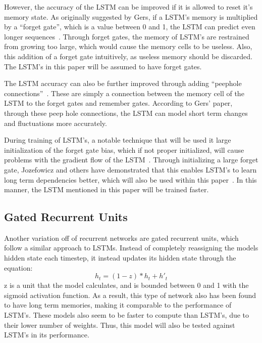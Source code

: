 \documentclass{article}
\begin{document}
However, the accuracy of the LSTM can be improved if it is allowed to reset
it's memory state. As originally suggested by Gers, if a LSTM's memory is
multiplied by a ``forget gate'', which is a value between 0 and 1, the LSTM can
predict even longer sequences~\cite{forgetgate}. Through forget gates, the memory of
LSTM's are restrained from growing too large, which would cause the memory cells
to be useless. Also, this addition of a forget gate intuitively, as useless
memory should be discarded. The LSTM's in this paper will be assumed to have
forget gates.

The LSTM accuracy can also be further improved through adding ``peephole
connections''~\cite{lstmpeep}. These are simply a connection between the memory
cell of the LSTM to the forget gates and remember gates. According to Gers'
paper, through these peep hole connections, the LSTM can model short term
changes and fluctuations more accurately.

During training of LSTM's, a notable technique that will be used it large
initialization of the forget gate bias, which if not proper initialized, will
cause problems with the gradient flow of the LSTM~\cite{lstmbias}. Through
initializing a large forget gate, Jozefowicz and others have demonstrated that
this enables LSTM's to learn long term dependencies better, which will also be
used within this paper~\cite{lstmbias}. In this manner, the LSTM mentioned in
this paper will be trained faster.


\subsection{Gated Recurrent Units}
Another variation off of recurrent networks are gated recurrent units, which
follow a similar approach to LSTMs. Instead of completely reassigning the models
hidden state each timestep, it instead updates its hidden state through the
equation:
$$h_t = (1 - z) * h_t + h'_t $$
z is a unit that the model calculates, and is bounded between 0 and 1 with the
sigmoid activation function. As a result, this type of network also has been
found to have long term memories, making it comparable to the performance of
LSTM's. These models also seem to be faster to compute than LSTM's, due to their
lower number of weights. Thus, this model will also be tested against LSTM's in
its performance.
\end{document}
